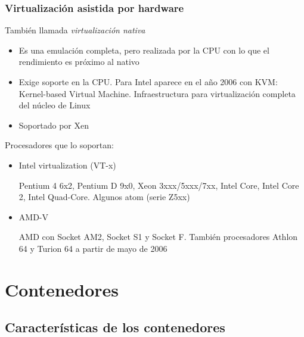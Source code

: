 \documentclass[ucs]{beamer}
\begin{document}
\begin{frame}[fragile]

\frametitle{Virtualización asistida por hardware}

También llamada \emph{virtualización nativa}


\begin{itemize}	
\item
Es una emulación completa, pero realizada por la CPU con
lo que el rendimiento es próximo al nativo
\item
Exige soporte en la CPU. Para Intel aparece en el año 2006 con 
KVM: Kernel-based Virtual Machine. Infraestructura para virtualización
completa del núcleo de Linux
\item
Soportado por Xen
\end{itemize}	
\end{frame}
\begin{frame}[fragile]

Procesadores que lo soportan:

\begin{itemize}	
\item
Intel virtualization (VT-x)

Pentium 4 6x2, Pentium D 9x0, Xeon 3xxx/5xxx/7xx, Intel Core, Intel Core 2,
Intel Quad-Core. Algunos atom (serie Z5xx)
\item
AMD-V 

AMD con Socket AM2, Socket S1 y Socket F. También procesadores Athlon 64 y Turion 64
a partir de mayo de 2006
\end{itemize}	



\end{frame}


\section{Contenedores}
\subsection{Características de los contenedores}
\end{document}
